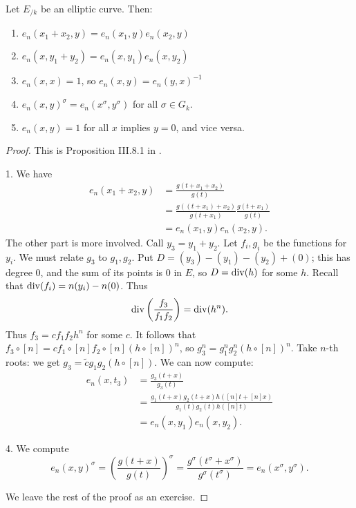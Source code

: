 \begin{theorem}
Let $E_{/k}$ be an elliptic curve. Then: 
\begin{enumerate}
  \item $e_n(x_1+x_2,y) = e_n(x_1,y) e_n(x_2,y)$ 
  \item $e_n(x,y_1+y_2) = e_n(x,y_1) e_n(x,y_2)$ 
  \item $e_n(x,x)=1$, so $e_n(x,y) = e_n(y,x)^{-1}$ 
  \item $e_n(x,y)^\sigma = e_n(x^\sigma,y^\sigma)$ for all $\sigma\in G_k$. 
  \item $e_n(x,y)=1$ for all $x$ implies $y=0$, and vice versa. 
\end{enumerate}
\end{theorem}
\begin{proof}
This is Proposition III.8.1 in \cite{silverman-2009}. 

1. We have 
\begin{align*}
  e_n(x_1+x_2,y) 
    &= \frac{g(t+x_1+x_2)}{g(t)} \\
    &= \frac{g((t+x_1)+x_2)}{g(t+x_1)} \frac{g(t+x_1)}{g(t)} \\
    &= e_n(x_1,y) e_n(x_2,y) .
\end{align*}
The other part is more involved. Call $y_3=y_1+y_2$. Let 
$f_i,g_i$ be the functions for $y_i$. We must relate $g_3$ to $g_1,g_2$. 
Put $D=(y_3)-(y_1)-(y_2)+(0)$; this has degree $0$, and the sum of its points 
is $0$ in $E$, so $D=\operatorname{div}(h)$ for some $h$. Recall that 
$\operatorname{div}(f_i) = n(y_i) - n(0)$. Thus 
\[
  \operatorname{div}\left(\frac{f_3}{f_1 f_2}\right) = \operatorname{div}(h^n) .
\]
Thus $f_3=c f_1 f_2 h^n$ for some $c$. It follows that 
$f_3\circ [n] = c f_1\circ [n] f_2\circ [n] (h\circ [n])^n$, so 
$g_3^n = g_1^n g_2^n (h\circ [n])^n$. Take $n$-th roots: we get 
$g_3 = \widetilde c g_1 g_2 (h\circ [n])$. We can now compute: 
\begin{align*}
  e_n(x,t_3) 
    &= \frac{g_3(t+x)}{g_3(t)} \\
    &= \frac{g_1(t+x)g_2(t+x)h([n] t+[n] x)}{g_1(t) g_2(t) h([n] t)} \\
    &= e_n(x,y_1) e_n(x,y_2) .
\end{align*}

4. We compute 
\[
  e_n(x,y)^\sigma 
    = \left(\frac{g(t+x)}{g(t)}\right)^\sigma 
    = \frac{g^\sigma(t^\sigma+x^\sigma)}{g^\sigma(t^\sigma)} 
    = e_n(x^\sigma,y^\sigma) .
\]

We leave the rest of the proof as an exercise. 
\end{proof}


